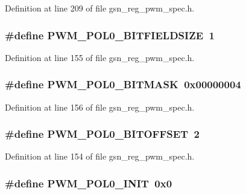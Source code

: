 Definition at line 209 of file gsn\_\-reg\_\-pwm\_\-spec.h.

\hypertarget{a00565_a0976f8f4717ee2f374fd23ee64cb60d5}{
\subsubsection[{PWM\_\-POL0\_\-BITFIELDSIZE}]{\setlength{\rightskip}{0pt plus 5cm}\#define PWM\_\-POL0\_\-BITFIELDSIZE~1}}
\label{a00565_a0976f8f4717ee2f374fd23ee64cb60d5}


Definition at line 155 of file gsn\_\-reg\_\-pwm\_\-spec.h.

\hypertarget{a00565_a169e4ad3a000055444ecf5f5a0a3d99c}{
\subsubsection[{PWM\_\-POL0\_\-BITMASK}]{\setlength{\rightskip}{0pt plus 5cm}\#define PWM\_\-POL0\_\-BITMASK~0x00000004}}
\label{a00565_a169e4ad3a000055444ecf5f5a0a3d99c}


Definition at line 156 of file gsn\_\-reg\_\-pwm\_\-spec.h.

\hypertarget{a00565_a9d39b8850cc9ac2c4fa32e9cc1bce5f9}{
\subsubsection[{PWM\_\-POL0\_\-BITOFFSET}]{\setlength{\rightskip}{0pt plus 5cm}\#define PWM\_\-POL0\_\-BITOFFSET~2}}
\label{a00565_a9d39b8850cc9ac2c4fa32e9cc1bce5f9}


Definition at line 154 of file gsn\_\-reg\_\-pwm\_\-spec.h.

\hypertarget{a00565_ac58d25159b2b429b71bb96545f3b3673}{
\subsubsection[{PWM\_\-POL0\_\-INIT}]{\setlength{\rightskip}{0pt plus 5cm}\#define PWM\_\-POL0\_\-INIT~0x0}}
\label{a00565_ac58d25159b2b429b71bb96545f3b3673}


